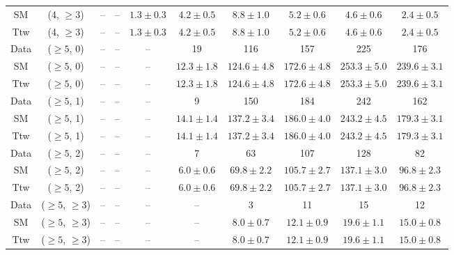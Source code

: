 \begin{table}[h!]
{\begin{tabular}{cccccccccc}
	SM & (4, $\ge3$) & -- & -- & $1.3\pm 0.3$ & $4.2\pm 0.5$ & $8.8\pm 1.0$ & $5.2\pm 0.6$ & $4.6\pm 0.6$ & $2.4\pm 0.5$ \\[0.5ex] 
	Ttw & (4, $\ge3$) & -- & -- & $1.3\pm 0.3$ & $4.2\pm 0.5$ & $8.8\pm 1.0$ & $5.2\pm 0.6$ & $4.6\pm 0.6$ & $2.4\pm 0.5$ \\[0.5ex] 
	Data & ($\ge5$, 0) & -- & -- & -- & 19 & 116 & 157 & 225 & 176 \\[0.5ex] 
	SM & ($\ge5$, 0) & -- & -- & -- & $12.3\pm 1.8$ & $124.6\pm 4.8$ & $172.6\pm 4.8$ & $253.3\pm 5.0$ & $239.6\pm 3.1$ \\[0.5ex] 
	Ttw & ($\ge5$, 0) & -- & -- & -- & $12.3\pm 1.8$ & $124.6\pm 4.8$ & $172.6\pm 4.8$ & $253.3\pm 5.0$ & $239.6\pm 3.1$ \\[0.5ex] 
	Data & ($\ge5$, 1) & -- & -- & -- & 9 & 150 & 184 & 242 & 162 \\[0.5ex] 
	SM & ($\ge5$, 1) & -- & -- & -- & $14.1\pm 1.4$ & $137.2\pm 3.4$ & $186.0\pm 4.0$ & $243.2\pm 4.5$ & $179.3\pm 3.1$ \\[0.5ex] 
	Ttw & ($\ge5$, 1) & -- & -- & -- & $14.1\pm 1.4$ & $137.2\pm 3.4$ & $186.0\pm 4.0$ & $243.2\pm 4.5$ & $179.3\pm 3.1$ \\[0.5ex] 
	Data & ($\ge5$, 2) & -- & -- & -- & 7 & 63 & 107 & 128 & 82 \\[0.5ex] 
	SM & ($\ge5$, 2) & -- & -- & -- & $6.0\pm 0.6$ & $69.8\pm 2.2$ & $105.7\pm 2.7$ & $137.1\pm 3.0$ & $96.8\pm 2.3$ \\[0.5ex] 
	Ttw & ($\ge5$, 2) & -- & -- & -- & $6.0\pm 0.6$ & $69.8\pm 2.2$ & $105.7\pm 2.7$ & $137.1\pm 3.0$ & $96.8\pm 2.3$ \\[0.5ex] 
	Data & ($\ge5$, $\ge3$) & -- & -- & -- & -- & 3 & 11 & 15 & 12 \\[0.5ex] 
	SM & ($\ge5$, $\ge3$) & -- & -- & -- & -- & $8.0\pm 0.7$ & $12.1\pm 0.9$ & $19.6\pm 1.1$ & $15.0\pm 0.8$ \\[0.5ex] 
	Ttw & ($\ge5$, $\ge3$) & -- & -- & -- & -- & $8.0\pm 0.7$ & $12.1\pm 0.9$ & $19.6\pm 1.1$ & $15.0\pm 0.8$ \\[0.5ex] 
	\hline
	\hline
\end{tabular}}
\end{table}
